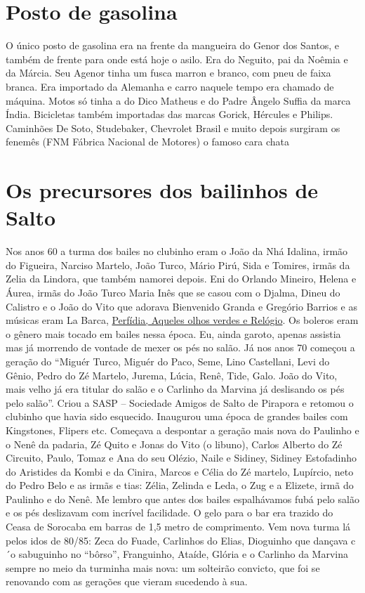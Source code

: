 \documentclass[12pt,brazil,]{book}
\begin{document}
\section{Posto de gasolina}\label{posto-de-gasolina}

O único posto de gasolina era na frente da mangueira do Genor dos
Santos, e também de frente para onde está hoje o asilo. Era do Neguito,
pai da Noêmia e da Márcia. Seu Agenor tinha um fusca marron e branco,
com pneu de faixa branca. Era importado da Alemanha e carro naquele
tempo era chamado de máquina. Motos só tinha a do Dico Matheus e do
Padre Ângelo Suffia da marca Índia. Bicicletas também importadas das
marcas Gorick, Hércules e Philips. Caminhões De Soto, Studebaker,
Chevrolet Brasil e muito depois surgiram os fenemês (FNM Fábrica
Nacional de Motores) o famoso cara chata

\section{Os precursores dos bailinhos de
Salto}\label{os-precursores-dos-bailinhos-de-salto}

Nos anos 60 a turma dos bailes no clubinho eram o João da Nhá Idalina,
irmão do Figueira, Narciso Martelo, João Turco, Mário Pirú, Sida e
Tomires, irmãs da Zelia da Lindora, que também namorei depois. Eni do
Orlando Mineiro, Helena e Áurea, irmãs do João Turco Maria Inês que se
casou com o Djalma, Dineu do Calistro e o João do Vito que adorava
Bienvenido Granda e Gregório Barrios e as músicas eram La Barca,
\href{https://www.youtube.com/watch?v=ceMTq1AS7Qs\&list=PLUu3jf3Dq_v9ZzFETDLGGFBcgOhEQkD-a\&index=220}{Perfídia,
Aqueles olhos verdes e Relógio}. Os boleros eram o gênero mais tocado em
bailes nessa época. Eu, ainda garoto, apenas assistia mas já morrendo de
vontade de mexer os pés no salão. Já nos anos 70 começou a geração do
``Miguér Turco, Miguér do Paco, Seme, Lino Castellani, Levi do Gênio,
Pedro do Zé Martelo, Jurema, Lúcia, Renê, Tide, Galo. João do Vito, mais
velho já era titular do salão e o Carlinho da Marvina já deslisando os
pés pelo salão''. Criou a SASP -- Sociedade Amigos de Salto de Pirapora
e retomou o clubinho que havia sido esquecido. Inaugurou uma época de
grandes bailes com Kingstones, Flipers etc. Começava a despontar a
geração mais nova do Paulinho e o Nenê da padaria, Zé Quito e Jonas do
Vito (o libuno), Carlos Alberto do Zé Circuito, Paulo, Tomaz e Ana do
seu Olézio, Naile e Sidiney, Sidiney Estofadinho do Aristides da Kombi e
da Cinira, Marcos e Célia do Zé martelo, Lupírcio, neto do Pedro Belo e
as irmãs e tias: Zélia, Zelinda e Leda, o Zug e a Elizete, irmã do
Paulinho e do Nenê. Me lembro que antes dos bailes espalhávamos fubá
pelo salão e os pés deslizavam com incrível facilidade. O gelo para o
bar era trazido do Ceasa de Sorocaba em barras de 1,5 metro de
comprimento. Vem nova turma lá pelos idos de 80/85: Zeca do Fuade,
Carlinhos do Elias, Dioguinho que dançava c´o sabuguinho no ``bôrso'',
Franguinho, Ataíde, Glória e o Carlinho da Marvina sempre no meio da
turminha mais nova: um solteirão convicto, que foi se renovando com as
gerações que vieram sucedendo à sua.
\end{document}

